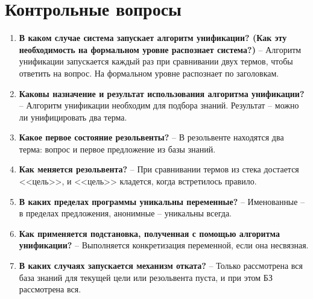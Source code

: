 \chapter{Контрольные вопросы}
\begin{enumerate}
	\item \textbf{В каком случае система запускает алгоритм унификации? (Как эту необходимость на формальном уровне распознает система?)} -- Алгоритм унификации запускается каждый раз при сравнивании двух термов, чтобы ответить на вопрос. На формальном уровне распознает по заголовкам.
	\item \textbf{Каковы назначение и результат использования алгоритма унификации?} -- Алгоритм унификации необходим для подбора знаний. Результат -- можно ли унифицировать два терма.
	\item \textbf{Какое первое состояние резольвенты?} -- В резольвенте находятся два терма: вопрос и первое предложение из базы знаний.
	\item \textbf{Как меняется резольвента?} -- При сравнивании термов из стека достается <<цель>>, и <<цель>> кладется, когда встретилось правило.
	\item \textbf{В каких пределах программы уникальны переменные?} -- Именованные -- в пределах предложения, анонимные -- уникальны всегда.
	\item \textbf{Как применяется подстановка, полученная с помощью алгоритма унификации?} -- Выполняется конкретизация переменной, если она несвязная.
	\item \textbf{В каких случаях запускается механизм отката?} -- Только рассмотрена вся база знаний для текущей цели или резольвента пуста, и при этом БЗ рассмотрена вся.
\end{enumerate}